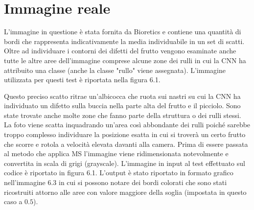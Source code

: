 \documentclass[12pt,a4paper]{report}
\begin{document}
{\section{Immagine reale}
L'immagine in questione è stata fornita da Bioretics e contiene una quantità di bordi che rappresenta indicativamente la media individuabile in un set di scatti. Oltre ad individuare i contorni dei difetti del frutto vengono esaminate anche tutte le altre aree dell'immagine comprese alcune zone dei rulli in cui la CNN ha attribuito una classe (anche la classe "rullo" viene assegnata).
L'immagine utilizzata per questi test è riportata nella figura 6.1.
\begin{figure}[H]
\centering
\begin{floatrow}[1]
\end{floatrow}
\end{figure} 
Questo preciso scatto ritrae un'albicocca che ruota sui nastri su cui la CNN ha individuato un difetto sulla buccia nella parte alta del frutto e il picciolo. Sono state trovate anche molte zone che fanno parte della struttura o dei rulli stessi. La foto viene scatta inquadrando un'area così abbondante dei rulli poiché sarebbe troppo complesso individuare la posizione esatta in cui si troverà un certo frutto che scorre e rotola a velocità elevata davanti alla camera.
\newpage
Prima di essere passata al metodo che applica MS l'immagine viene ridimensionata notevolmente e convertita in scala di grigi (grayscale). L'immagine in input al test effettuato sul codice è riportato in figura 6.1.
L'output è stato riportato in formato grafico nell'immagine 6.3 in cui si possono notare dei bordi colorati che sono stati ricostruiti attorno alle aree con valore maggiore della soglia (impostata in questo caso a $0.5$).
\begin{figure}[H]
\centering
\begin{floatrow}[1]
\end{floatrow}
\end{figure} 

}
\end{document}
